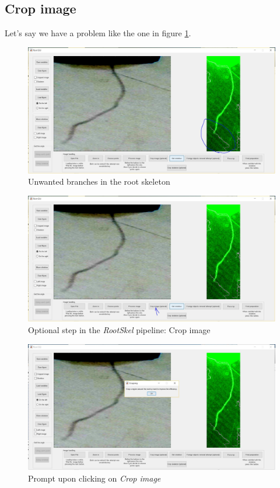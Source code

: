 \subsection{Crop image}

Let's say we have a problem like the one in figure \ref{fig:img46}.

\begin{figure}[H]
	\centering
	\includegraphics[width=\textwidth]{../Figures/manual/optionalC1.jpg}
	\caption{Unwanted branches in the root skeleton}
	\label{fig:img46}
\end{figure}

\begin{figure}[H]
	\centering
	\includegraphics[width=\textwidth]{../Figures/manual/optionalC2.jpg}
	\caption{Optional step in the \textit{RootSkel} pipeline: Crop image}
	\label{fig:img47}
\end{figure}

\begin{figure}[H]
	\centering
	\includegraphics[width=\textwidth]{../Figures/manual/optionalC3.jpg}
	\caption{Prompt upon clicking on \textit{Crop image}}
	\label{fig:img48}
\end{figure}

